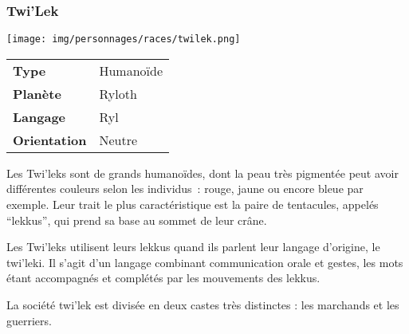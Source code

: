 \subsubsection{Twi’Lek}
\begin{samepage}
	\vspace{-1\baselineskip}
	\texttt{[image: img/personnages/races/twilek.png]}
	\vspace{-5\baselineskip}
	\begin{flushright}
		\begin{tabular}{ l l }
			\textbf{Type} 			& Humanoïde \\
		   	\textbf{Planète} 		& Ryloth \\
		   	\textbf{Langage} 		& Ryl \\
		   	\textbf{Orientation} 	& Neutre \\
		\end{tabular}
	\end{flushright}
\end{samepage}

Les Twi’leks sont de grands humanoïdes, dont la peau très pigmentée peut avoir différentes couleurs selon les individus~: rouge, jaune ou encore bleue par exemple. Leur trait le plus caractéristique est la paire de tentacules, appelés “lekkus”, qui prend sa base au sommet de leur crâne.

Les Twi’leks utilisent leurs lekkus quand ils parlent leur langage d’origine, le twi’leki. Il s’agit d’un langage combinant communication orale et gestes, les mots étant accompagnés et complétés par les mouvements des lekkus.

La société twi’lek est divisée en deux castes très distinctes : les marchands et les guerriers.

